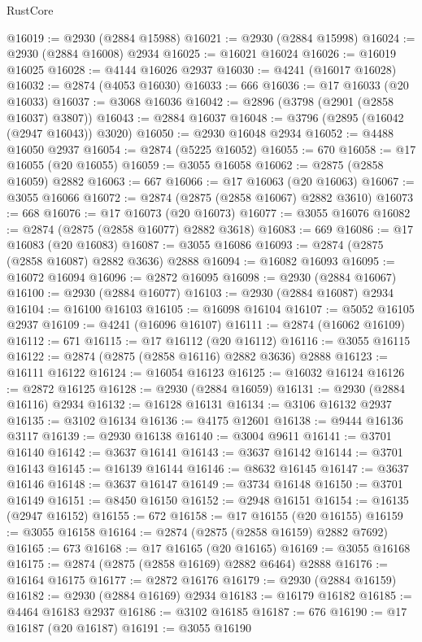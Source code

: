 \begin{lexlean}{RustCore}
\begin{coremodule}
@16019 := @2930 (@2884 @15988)
@16021 := @2930 (@2884 @15998)
@16024 := @2930 (@2884 @16008) @2934
@16025 := @16021 @16024
@16026 := @16019 @16025
@16028 := @4144 @16026 @2937
@16030 := @4241 (@16017 @16028)
@16032 := @2874 (@4053 @16030)
@16033 := 666
@16036 := @17 @16033 (@20 @16033)
@16037 := @3068 @16036
@16042 := @2896 (@3798 (@2901 (@2858 @16037) @3807))
@16043 := @2884 @16037
@16048 := @3796 (@2895 (@16042 (@2947 @16043)) @3020)
@16050 := @2930 @16048 @2934
@16052 := @4488 @16050 @2937
@16054 := @2874 (@5225 @16052)
@16055 := 670
@16058 := @17 @16055 (@20 @16055)
@16059 := @3055 @16058
@16062 := @2875 (@2858 @16059) @2882
@16063 := 667
@16066 := @17 @16063 (@20 @16063)
@16067 := @3055 @16066
@16072 := @2874 (@2875 (@2858 @16067) @2882 @3610)
@16073 := 668
@16076 := @17 @16073 (@20 @16073)
@16077 := @3055 @16076
@16082 := @2874 (@2875 (@2858 @16077) @2882 @3618)
@16083 := 669
@16086 := @17 @16083 (@20 @16083)
@16087 := @3055 @16086
@16093 := @2874 (@2875 (@2858 @16087) @2882 @3636) @2888
@16094 := @16082 @16093
@16095 := @16072 @16094
@16096 := @2872 @16095
@16098 := @2930 (@2884 @16067)
@16100 := @2930 (@2884 @16077)
@16103 := @2930 (@2884 @16087) @2934
@16104 := @16100 @16103
@16105 := @16098 @16104
@16107 := @5052 @16105 @2937
@16109 := @4241 (@16096 @16107)
@16111 := @2874 (@16062 @16109)
@16112 := 671
@16115 := @17 @16112 (@20 @16112)
@16116 := @3055 @16115
@16122 := @2874 (@2875 (@2858 @16116) @2882 @3636) @2888
@16123 := @16111 @16122
@16124 := @16054 @16123
@16125 := @16032 @16124
@16126 := @2872 @16125
@16128 := @2930 (@2884 @16059)
@16131 := @2930 (@2884 @16116) @2934
@16132 := @16128 @16131
@16134 := @3106 @16132 @2937
@16135 := @3102 @16134
@16136 := @4175 @12601
@16138 := @9444 @16136 @3117
@16139 := @2930 @16138
@16140 := @3004 @9611
@16141 := @3701 @16140
@16142 := @3637 @16141
@16143 := @3637 @16142
@16144 := @3701 @16143
@16145 := @16139 @16144
@16146 := @8632 @16145
@16147 := @3637 @16146
@16148 := @3637 @16147
@16149 := @3734 @16148
@16150 := @3701 @16149
@16151 := @8450 @16150
@16152 := @2948 @16151
@16154 := @16135 (@2947 @16152)
@16155 := 672
@16158 := @17 @16155 (@20 @16155)
@16159 := @3055 @16158
@16164 := @2874 (@2875 (@2858 @16159) @2882 @7692)
@16165 := 673
@16168 := @17 @16165 (@20 @16165)
@16169 := @3055 @16168
@16175 := @2874 (@2875 (@2858 @16169) @2882 @6464) @2888
@16176 := @16164 @16175
@16177 := @2872 @16176
@16179 := @2930 (@2884 @16159)
@16182 := @2930 (@2884 @16169) @2934
@16183 := @16179 @16182
@16185 := @4464 @16183 @2937
@16186 := @3102 @16185
@16187 := 676
@16190 := @17 @16187 (@20 @16187)
@16191 := @3055 @16190

\end{coremodule}
\end{lexlean}
